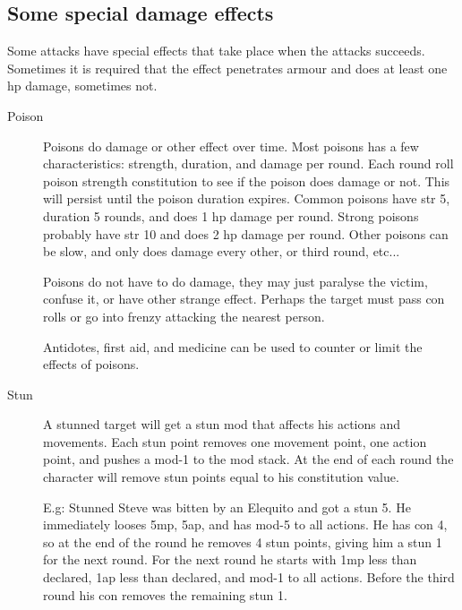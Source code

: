 

\subsection*{Some special damage effects}
Some attacks have special effects that take place when the attacks succeeds. Sometimes it is required that the effect penetrates armour and does at least one hp damage, sometimes not.


\begin{description}


\item[Poison]
Poisons do damage or other effect over time. Most poisons has a few characteristics: strength, duration, and damage per round. Each round roll poison strength \vs constitution to see if the poison does damage or not. This will persist until the poison duration expires. Common poisons have str 5, duration 5 rounds, and does 1 hp damage per round. Strong poisons probably have str 10 and does 2 hp damage per round. Other poisons can be slow, and only does damage every other, or third round, etc...

Poisons do not have to do damage, they may just paralyse the victim, confuse it, or have other strange effect. Perhaps the target must pass con rolls or go into frenzy attacking the nearest person.

Antidotes, first aid, and medicine can be used to counter or limit the effects of poisons.


\item[Stun]
A stunned target will get a stun mod that affects his actions and movements. Each stun point removes one movement point, one action point, and pushes a mod-1 to the mod stack. At the end of each round the character will remove stun points equal to his constitution value.

E.g: Stunned Steve was bitten by an Elequito and got a stun 5. He immediately looses 5mp, 5ap, and has mod-5 to all actions. He has con 4, so at the end of the round he removes 4 stun points, giving him a stun 1 for the next round. For the next round he starts with 1mp less than declared, 1ap less than declared, and mod-1 to all actions. Before the third round his con removes the remaining stun 1.



\end{description}
